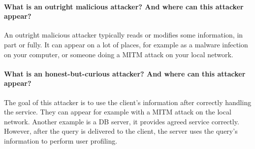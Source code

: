 \paragraph{What is an outright malicious attacker? And where can this attacker appear?}
An outright malicious attacker typically reads or modifies some information, in part or fully. It can appear on a lot of places, for example as a malware infection on your computer, or someone doing a MITM attack on your local network.

\paragraph{What is an honest-but-curious attacker? And where can this attacker appear?}
The goal of this attacker is to use the client's information after correctly handling the service. They can appear for example with a MITM attack on the local network. Another example is a DB server, it provides agreed service correctly. However, after the query is delivered to the client, the server uses the query's information to perform user profiling.